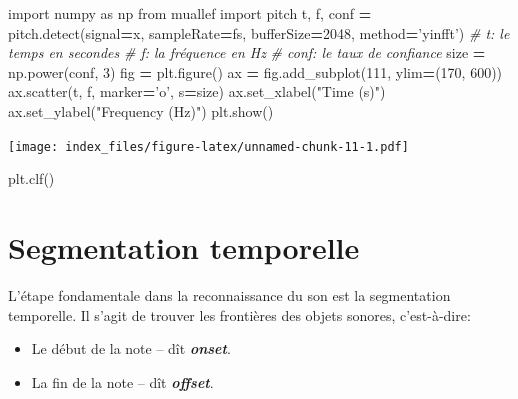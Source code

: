 \documentclass[french,]{article}
\newenvironment{Shaded}{\begin{snugshade}}{\end{snugshade}}
\newcommand{\CommentTok}[1]{\textcolor[rgb]{0.56,0.35,0.01}{\textit{#1}}}
\newcommand{\DecValTok}[1]{\textcolor[rgb]{0.00,0.00,0.81}{#1}}
\newcommand{\ImportTok}[1]{#1}
\newcommand{\NormalTok}[1]{#1}
\newcommand{\OperatorTok}[1]{\textcolor[rgb]{0.81,0.36,0.00}{\textbf{#1}}}
\newcommand{\StringTok}[1]{\textcolor[rgb]{0.31,0.60,0.02}{#1}}
\providecommand{\tightlist}{%
  \setlength{\itemsep}{0pt}\setlength{\parskip}{0pt}}
\begin{document}
\begin{Shaded}
\begin{Highlighting}[]
\ImportTok{import}\NormalTok{ numpy }\ImportTok{as}\NormalTok{ np}
\ImportTok{from}\NormalTok{ muallef }\ImportTok{import}\NormalTok{ pitch}
\NormalTok{t, f, conf }\OperatorTok{=}\NormalTok{ pitch.detect(signal}\OperatorTok{=}\NormalTok{x, sampleRate}\OperatorTok{=}\NormalTok{fs, bufferSize}\OperatorTok{=}\DecValTok{2048}\NormalTok{, method}\OperatorTok{=}\StringTok{'yinfft'}\NormalTok{)}
\CommentTok{# t: le temps en secondes}
\CommentTok{# f: la fréquence en Hz}
\CommentTok{# conf: le taux de confiance}
\NormalTok{size }\OperatorTok{=}\NormalTok{ np.power(conf, }\DecValTok{3}\NormalTok{)}
\NormalTok{fig }\OperatorTok{=}\NormalTok{ plt.figure()}
\NormalTok{ax }\OperatorTok{=}\NormalTok{ fig.add_subplot(}\DecValTok{111}\NormalTok{, ylim}\OperatorTok{=}\NormalTok{(}\DecValTok{170}\NormalTok{, }\DecValTok{600}\NormalTok{))}
\NormalTok{ax.scatter(t, f, marker}\OperatorTok{=}\StringTok{'o'}\NormalTok{, s}\OperatorTok{=}\NormalTok{size)}
\NormalTok{ax.set_xlabel(}\StringTok{"Time (s)"}\NormalTok{)}
\NormalTok{ax.set_ylabel(}\StringTok{"Frequency (Hz)"}\NormalTok{)}
\NormalTok{plt.show()}
\end{Highlighting}
\end{Shaded}

\texttt{[image: index\_files/figure-latex/unnamed-chunk-11-1.pdf]}

\begin{Shaded}
\begin{Highlighting}[]
\NormalTok{plt.clf()}
\end{Highlighting}
\end{Shaded}

\pagebreak

\hypertarget{segmentation-temporelle}{%
\section{Segmentation temporelle}\label{segmentation-temporelle}}

L'étape fondamentale dans la reconnaissance du son est la segmentation
temporelle. Il s'agit de trouver les frontières des objets sonores,
c'est-à-dire:

\begin{itemize}
\tightlist
\item
  Le début de la note -- dît \textbf{\emph{onset}}.
\item
  La fin de la note -- dît \textbf{\emph{offset}}.
\end{itemize}
\end{document}
